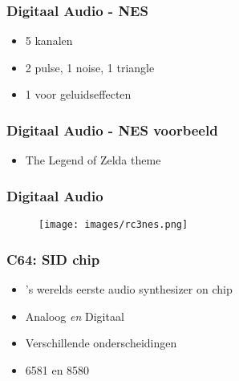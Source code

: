 
\begin{frame}
\frametitle{Digitaal Audio - NES}

\begin{itemize}
\item 5 kanalen
\item 2 pulse, 1 noise, 1 triangle
\item 1 voor geluidseffecten
\end{itemize}

\end{frame}


\begin{frame}
\frametitle{Digitaal Audio - NES voorbeeld}

\begin{itemize}
\item The Legend of Zelda theme
\end{itemize}

\end{frame}


\begin{frame}
\frametitle{Digitaal Audio}

\begin{figure}
\texttt{[image: images/rc3nes.png]}
\end{figure}

\end{frame}


\begin{frame}
\frametitle{C64: SID chip}

\begin{itemize}
\item 's werelds eerste audio synthesizer on chip
\item Analoog \emph{en} Digitaal
\item Verschillende onderscheidingen
\item 6581 en 8580
\end{itemize}

\end{frame}


